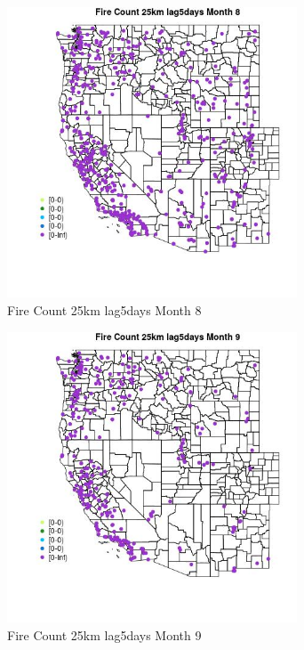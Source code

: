 \begin{figure} 
\centering  
\includegraphics[width=0.77\textwidth]{Code_Outputs/Report_ML_input_PM25_Step4_part_e_de_duplicated_aves_compiled_2019-05-18wNAs_MapObsMo8Fire_Count_25km_lag5days.jpg} 
\caption{\label{fig:Report_ML_input_PM25_Step4_part_e_de_duplicated_aves_compiled_2019-05-18wNAsMapObsMo8Fire_Count_25km_lag5days}Fire Count 25km lag5days Month 8} 
\end{figure} 
 

\begin{figure} 
\centering  
\includegraphics[width=0.77\textwidth]{Code_Outputs/Report_ML_input_PM25_Step4_part_e_de_duplicated_aves_compiled_2019-05-18wNAs_MapObsMo9Fire_Count_25km_lag5days.jpg} 
\caption{\label{fig:Report_ML_input_PM25_Step4_part_e_de_duplicated_aves_compiled_2019-05-18wNAsMapObsMo9Fire_Count_25km_lag5days}Fire Count 25km lag5days Month 9} 
\end{figure} 
 

